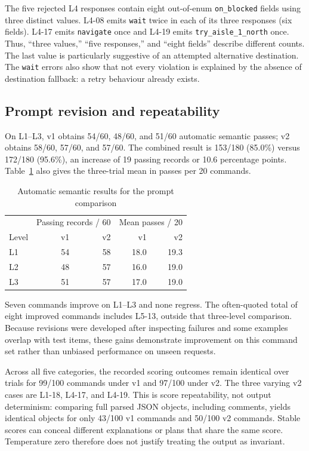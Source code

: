 \documentclass[journal]{IEEEtran}
\newcommand{\field}[1]{\texttt{#1}}
\begin{document}
The five rejected L4 responses contain eight out-of-enum \field{on\_blocked} fields using three distinct values. L4-08 emits \field{wait} twice in each of its three responses (six fields). L4-17 emits \field{navigate} once and L4-19 emits \field{try\_aisle\_1\_north} once. Thus, ``three values,'' ``five responses,'' and ``eight fields'' describe different counts. The last value is particularly suggestive of an attempted alternative destination. The \field{wait} errors also show that not every violation is explained by the absence of destination fallback: a retry behaviour already exists.

\subsection{Prompt revision and repeatability}
On L1--L3, v1 obtains 54/60, 48/60, and 51/60 automatic semantic passes; v2 obtains 58/60, 57/60, and 57/60. The combined result is 153/180 (85.0\%) versus 172/180 (95.6\%), an increase of 19 passing records or 10.6 percentage points. Table~\ref{tab:prompt} also gives the three-trial mean in passes per 20 commands.

\begin{table}[t]
\caption{Automatic semantic results for the prompt comparison}
\label{tab:prompt}\centering\small
\begin{tabular}{@{}lrrrr@{}}
\toprule
& \multicolumn{2}{c}{Passing records / 60} & \multicolumn{2}{c}{Mean passes / 20}\\
Level & v1 & v2 & v1 & v2\\\midrule
L1 & 54 & 58 & 18.0 & 19.3\\
L2 & 48 & 57 & 16.0 & 19.0\\
L3 & 51 & 57 & 17.0 & 19.0\\
\bottomrule
\end{tabular}
\end{table}

Seven commands improve on L1--L3 and none regress. The often-quoted total of eight improved commands includes L5-13, outside that three-level comparison. Because revisions were developed after inspecting failures and some examples overlap with test items, these gains demonstrate improvement on this command set rather than unbiased performance on unseen requests.

Across all five categories, the recorded scoring outcomes remain identical over trials for 99/100 commands under v1 and 97/100 under v2. The three varying v2 cases are L1-18, L4-17, and L4-19. This is score repeatability, not output determinism: comparing full parsed JSON objects, including comments, yields identical objects for only 43/100 v1 commands and 50/100 v2 commands. Stable scores can conceal different explanations or plans that share the same score. Temperature zero therefore does not justify treating the output as invariant.
\end{document}
